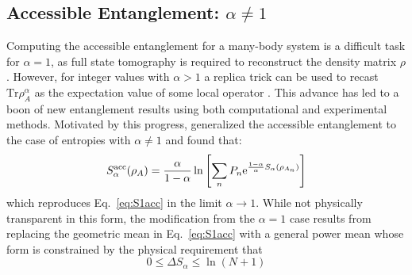 \subsection{\ren Accessible Entanglement: $\alpha \ne 1$}

Computing the accessible entanglement for a many-body system is a difficult task for $\alpha=1$, as full state tomography is required to reconstruct the density matrix $\rho$. However, for integer values with $\alpha > 1$ a replica trick can be used to recast $\mathrm{Tr} \rho_A^\alpha$ as the expectation value of some local operator \cite{Calabrese:2004hl}. This advance has led to a boon of new entanglement results using both computational \cite{Hastings:2010dc, Humeniuk:2012cq, McMinis:2013dp, Herdman:2014ey, Drut:2015fs} and experimental \cite{Daley:2012bd, Islam:2015cm, Kaufman:2016ep, Pichler:2016ec, Linke:2017tf, Lukin:2018wg} methods.  Motivated by this progress, \cite{PhysRevLett.121.150501} generalized the accessible entanglement to the case of \ren entropies with $\alpha \ne 1$ and found that:
%
\begin{equation}
S_{\alpha}^{{\rm acc}} (\rho_A) = \frac{\alpha}{1-\alpha}\ln\left[ \sum_{n} P_n \mathrm{e}^{\frac{1-\alpha}{\alpha} S_{\alpha}(\rho_{A_n})}\right]
\label{eq:S_alpha_acc}
\end{equation} 
%
which reproduces Eq.~\eqref{eq:S1acc} in the limit $\alpha \to 1$. While not physically transparent in this form, the modification from the $\alpha=1$ case results from replacing the geometric mean in Eq.~\eqref{eq:S1acc} with a general power mean whose form is constrained by the physical requirement that
%
\begin{equation}
 0 \le \Delta S_\alpha \le \ln (N+1)
\label{eq:DeltaS_alpha_inq}
\end{equation}
